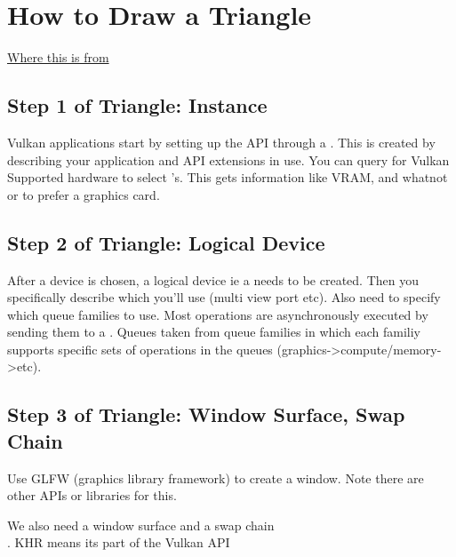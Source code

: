 

\chapter{How to Draw a Triangle}
\begin{center}
    \href{vulkan-tutorial.com/en/Overview}{Where this is from}
\end{center}
\newpage
\section*{Step 1 of Triangle: Instance}

\par Vulkan applications start by setting up the API through a . This is created by describing your application and API extensions in use. You can query for Vulkan Supported hardware to select 's. This gets information like VRAM, and whatnot or to prefer a graphics card.

\section*{Step 2 of Triangle: Logical Device}
\par After a device is chosen, a logical device ie a  needs to be created. Then you specifically describe which  you'll use (multi view port etc). Also need to specify which queue families to use. Most
operations are asynchronously executed by sending them to a . Queues taken from queue families in which each familiy supports specific sets of operations in the queues (graphics->compute/memory->etc).
\section*{Step 3 of Triangle: Window Surface, Swap Chain}
\par Use GLFW (graphics library framework) to create a window. Note there are other APIs or libraries for this.
\par We also need a window surface  and a swap chain \\ . KHR means its part of the Vulkan API


